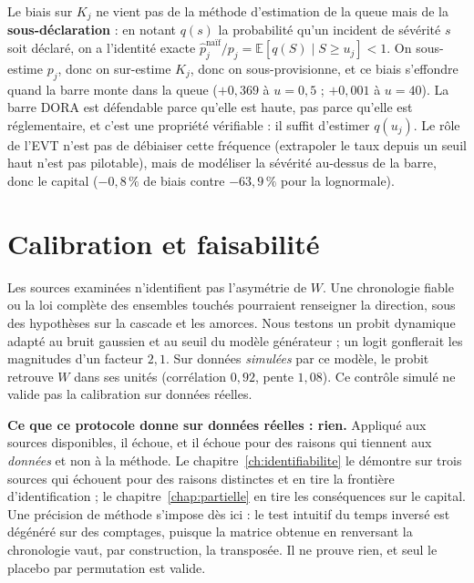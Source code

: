 \noindent Le biais sur $K_j$ ne vient pas de la méthode d'estimation de la queue mais de la
\textbf{sous-déclaration} : en notant $q(s)$ la probabilité qu'un incident de sévérité $s$ soit
déclaré, on a l'identité exacte $\hat p_j^{\text{naïf}}/p_j=\mathbb E[q(S)\mid S\ge u_j]<1$. On
sous-estime $p_j$, donc on sur-estime $K_j$, donc on sous-provisionne, et ce biais s'effondre
quand la barre monte dans la queue ($+0{,}369$ à $u=0{,}5$ ; $+0{,}001$ à $u=40$). La
barre DORA est défendable parce qu'elle est haute, pas parce qu'elle est réglementaire, et
c'est une propriété vérifiable : il suffit d'estimer $q(u_j)$. Le rôle de l'EVT n'est pas de
débiaiser cette fréquence (extrapoler le taux depuis un seuil haut n'est pas pilotable), mais de
modéliser la sévérité au-dessus de la barre, donc le capital ($-0{,}8\,\%$ de biais
contre $-63{,}9\,\%$ pour la lognormale).


\section{Calibration et faisabilité}

Les sources examinées n'identifient pas l'asymétrie de $W$. Une chronologie fiable ou la loi complète des ensembles touchés
pourraient renseigner la direction, sous des hypothèses sur la cascade et les amorces.
Nous testons un probit dynamique adapté au bruit gaussien et au seuil du modèle générateur ; un logit gonflerait les magnitudes d'un facteur $2{,}1$.
Sur données \emph{simulées} par ce modèle, le probit retrouve $W$ dans ses unités (corrélation $0{,}92$, pente $1{,}08$).
Ce contrôle simulé ne valide pas la calibration sur données réelles.

\begin{attention}
\textbf{Ce que ce protocole donne sur données réelles : rien.} Appliqué aux sources
disponibles, il échoue, et il échoue pour des raisons qui tiennent aux \emph{données} et non à
la méthode. Le chapitre~\ref{ch:identifiabilite} le démontre sur trois sources qui échouent pour
des raisons distinctes et en tire la frontière d'identification ; le
chapitre~\ref{chap:partielle} en tire les conséquences sur le capital. Une précision de méthode
s'impose dès ici : le test intuitif du \og temps inversé \fg{} est dégénéré
sur des comptages, puisque la matrice obtenue en renversant la chronologie vaut, par
construction, la transposée. Il ne prouve rien, et seul le placebo par permutation est valide.
\end{attention}

